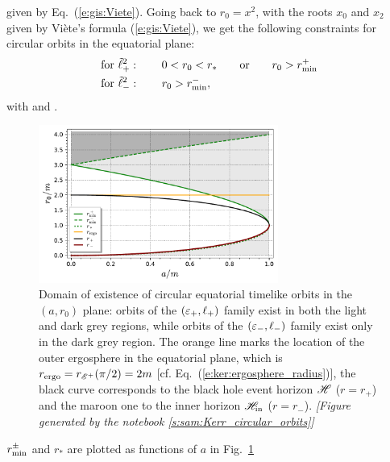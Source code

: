 given by Eq.~(\ref{e:gis:Viete}).
Going back to $r_0 = x^2$, with the roots $x_0$ and $x_2$ given by
Viète's formula (\ref{e:gis:Viete}), we get the following constraints
for circular orbits in the equatorial plane:
\begin{subequations}
\label{e:gek:range_circ}
\begin{align}
    & \mbox{for}\ \tilde{\ell}^2_+:\qquad
    0 < r_0 < r_* \qquad\mbox{or}\qquad r_0 > r_{\rm min}^+ \label{e:gek:range_circ_plus} \\
    & \mbox{for}\ \tilde{\ell}^2_-:\qquad r_0 > r_{\rm min}^- , \label{e:gek:range_circ_minus}
\end{align}
\end{subequations}
with
\be \label{e:gek:def_r_min_pm}
\ee
and
\be \label{e:gek:def_r_star}
    .
\ee
\begin{figure}
\centerline{\includegraphics[width=0.7\textwidth]{gek_circ_orb_lim.pdf}}
\caption[]{\label{f:gek:circ_orb_lim} \footnotesize
Domain of existence of circular equatorial timelike orbits in the $(a, r_0)$ plane:
orbits of the $(\varepsilon_+,\ell_+)$ family exist in both the light and dark grey regions,
while orbits of the $(\varepsilon_-,\ell_-)$ family exist only in the dark grey region.
The orange line marks
the location of the outer ergosphere in the equatorial plane, which is
$r_{\rm ergo} = r_{\mathscr{E}^+}(\pi/2) = 2m$ [cf. Eq.~(\ref{e:ker:ergosphere_radius})],
the black curve corresponds to the black hole event horizon $\mathscr{H}$
($r=r_+$) and the maroon one to the inner horizon
$\mathscr{H}_{\rm in}$ ($r=r_-$).
\textsl{[Figure generated by the notebook \ref{s:sam:Kerr_circular_orbits}]}
}
\end{figure}
$r_{\rm min}^\pm$ and $r_*$ are plotted as functions of $a$ in Fig.~\ref{f:gek:circ_orb_lim}
